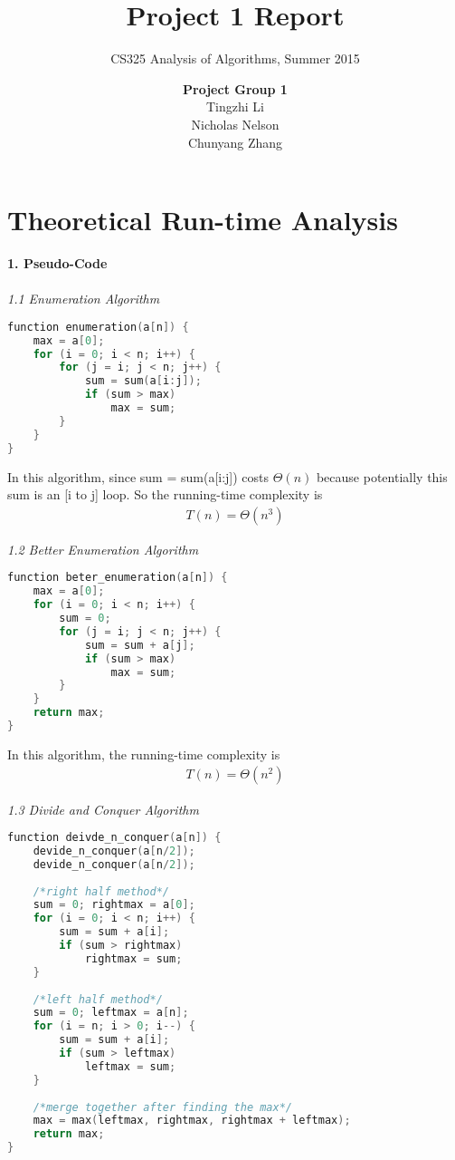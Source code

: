 \documentclass[11pt]{scrreprt}
\title{\textbf{Project 1 Report}}
\subtitle{CS325 Analysis of Algorithms, Summer 2015}
\author{\textbf{Project Group 1}\\
		Tingzhi Li\\
		Nicholas Nelson\\
		Chunyang Zhang}
\date{}
\begin{document}
\maketitle

\chapter{Theoretical Run-time Analysis}

\textbf{1. Pseudo-Code}\\\\
\textit{1.1 Enumeration Algorithm}\\

\begin{lstlisting}[language=c]
function enumeration(a[n]) {
	max = a[0];
	for (i = 0; i < n; i++) {
		for (j = i; j < n; j++) {
			sum = sum(a[i:j]);
			if (sum > max)
				max = sum;
		}
	}
}
\end{lstlisting}

In this algorithm, since sum = sum(a[i:j]) costs $\Theta(n)$ because potentially this sum is an [i to j] loop. So the running-time complexity is
\begin{eqnarray*}
T(n) = \Theta(n^3)
\end{eqnarray*}



\textit{1.2 Better Enumeration Algorithm}\\

\begin{lstlisting}[language=c]
function beter_enumeration(a[n]) {
	max = a[0];
	for (i = 0; i < n; i++) {
		sum = 0;
		for (j = i; j < n; j++) {
			sum = sum + a[j];
			if (sum > max)
				max = sum;
		}
	}
	return max;
}
\end{lstlisting}

In this algorithm, the running-time complexity is
\begin{eqnarray*}
T(n) = \Theta(n^2)
\end{eqnarray*}

\textit{1.3 Divide and Conquer Algorithm}\\

\begin{lstlisting}[language=c]
function deivde_n_conquer(a[n]) {
	devide_n_conquer(a[n/2]);
	devide_n_conquer(a[n/2]);
	
	/*right half method*/
	sum = 0; rightmax = a[0];
	for (i = 0; i < n; i++) {
		sum = sum + a[i];
		if (sum > rightmax)
			rightmax = sum;
	}
	
	/*left half method*/
	sum = 0; leftmax = a[n];
	for (i = n; i > 0; i--) {
		sum = sum + a[i];
		if (sum > leftmax)
			leftmax = sum;
	}
	
	/*merge together after finding the max*/
	max = max(leftmax, rightmax, rightmax + leftmax);
	return max;
}
\end{lstlisting}
\end{document}
